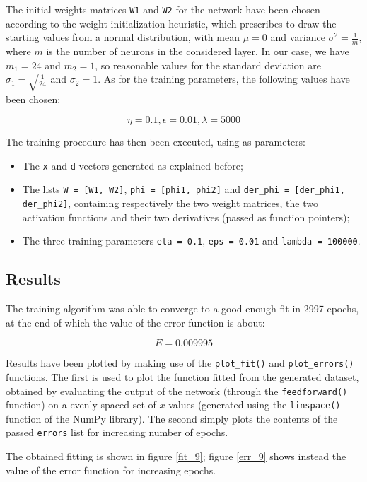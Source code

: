 \documentclass[letterpaper,headings=standardclasses]{scrartcl}
\begin{document}
The initial weights matrices \texttt{W1} and \texttt{W2} for the network have been chosen according to the weight initialization heuristic, which prescribes to draw the starting values from a normal distribution, with mean $\mu = 0$ and variance $\sigma^2 = \frac{1}{m}$, where $m$ is the number of neurons in the considered layer. In our case, we have $m_1 = 24$ and $m_2 = 1$, so reasonable values for the standard deviation are $\sigma_1 = \sqrt{\frac{1}{24}}$ and $\sigma_2 = 1$. As for the training parameters, the following values have been chosen:

$$ \eta = 0.1, \epsilon = 0.01, \lambda = 5000 $$

The training procedure has then been executed, using as parameters:

\begin{itemize}
    \item The \texttt{x} and \texttt{d} vectors generated as explained before;
    \item The lists \texttt{W = [W1, W2]}, \texttt{phi = [phi1, phi2]} and \texttt{der\_phi = [der\_phi1, der\_phi2]}, containing respectively the two weight matrices, the two activation functions and their two derivatives (passed as function pointers);
    \item The three training parameters \texttt{eta = 0.1}, \texttt{eps = 0.01} and \texttt{lambda = 100000}.
\end{itemize}

\subsection{Results}

The training algorithm was able to converge to a good enough fit in 2997 epochs, at the end of which the value of the error function is about:

$$ E = 0.009995 $$

Results have been plotted by making use of the \texttt{plot\_fit()} and \texttt{plot\_errors()} functions. The first is used to plot the function fitted from the generated dataset, obtained by evaluating the output of the network (through the \texttt{feedforward()} function) on a evenly-spaced set of $x$ values (generated using the \texttt{linspace()} function of the NumPy library). The second simply plots the contents of the passed \texttt{errors} list for increasing number of epochs.

The obtained fitting is shown in figure \ref{fit_9}; figure \ref{err_9} shows instead the value of the error function for increasing epochs.
\end{document}
